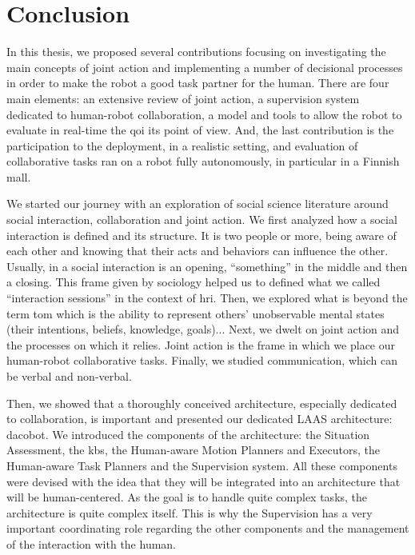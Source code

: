 \documentclass[a4paper,11pt,twoside]{StyleThese}
\begin{document}
\fi


\chapter*{Conclusion}


In this thesis, we proposed several contributions focusing on investigating the main concepts of joint action and implementing a number of decisional processes in order to make the robot a good task partner for the human. There are four main elements: an extensive review of joint action, a supervision system dedicated to human-robot collaboration, a model and tools to allow the robot to evaluate in real-time the \acrlong{qoi} its point of view. And, the last contribution is the participation to the deployment, in a realistic setting, and evaluation of collaborative tasks ran on a robot fully autonomously, in particular in a Finnish mall. 

We started our journey with an exploration of social science literature around social interaction, collaboration and joint action. We first analyzed how a social interaction is defined and its structure. It is two people or more, being aware of each other and knowing that their acts and behaviors can influence the other. Usually, in a social interaction is an opening, ``something'' in the middle and then a closing. This frame given by sociology helped us to defined what we called ``interaction sessions'' in the context of \acrshort{hri}. Then, we explored what is beyond the term \acrfull{tom} which is the ability to represent others' unobservable mental states (\ie their intentions, beliefs, knowledge, goals)... Next, we dwelt on joint action and the processes on which it relies. Joint action is the frame in which we place our human-robot collaborative tasks. Finally, we studied communication, which can be verbal and non-verbal.

Then, we showed that a thoroughly conceived architecture, especially dedicated to collaboration, is important and presented our dedicated LAAS architecture: \acrfull{dacobot}. We introduced the components of the architecture: the Situation Assessment, the \acrlong{kb}s, the Human-aware Motion Planners and Executors, the Human-aware Task Planners and the Supervision system. All these components were devised with the idea that they will be integrated into an architecture that will be human-centered. As the goal is to handle quite complex tasks, the architecture is quite complex itself. This is why the Supervision has a very important coordinating role regarding the other components and the management of the interaction with the human. 
\end{document}
